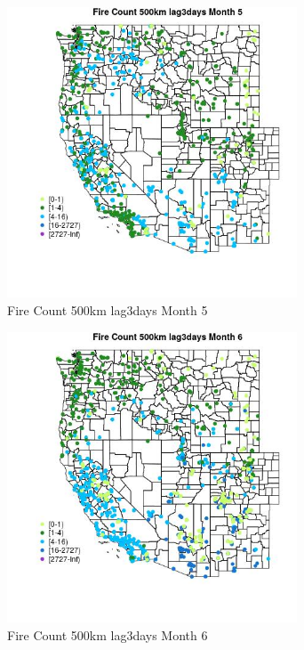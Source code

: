 \begin{figure} 
\centering  
\includegraphics[width=0.77\textwidth]{Code_Outputs/Report_ML_input_PM25_Step4_part_f_de_duplicated_aveswNAs_MapObsMo5Fire_Count_500km_lag3days.jpg} 
\caption{\label{fig:Report_ML_input_PM25_Step4_part_f_de_duplicated_aveswNAsMapObsMo5Fire_Count_500km_lag3days}Fire Count 500km lag3days Month 5} 
\end{figure} 
 

\begin{figure} 
\centering  
\includegraphics[width=0.77\textwidth]{Code_Outputs/Report_ML_input_PM25_Step4_part_f_de_duplicated_aveswNAs_MapObsMo6Fire_Count_500km_lag3days.jpg} 
\caption{\label{fig:Report_ML_input_PM25_Step4_part_f_de_duplicated_aveswNAsMapObsMo6Fire_Count_500km_lag3days}Fire Count 500km lag3days Month 6} 
\end{figure} 
 

